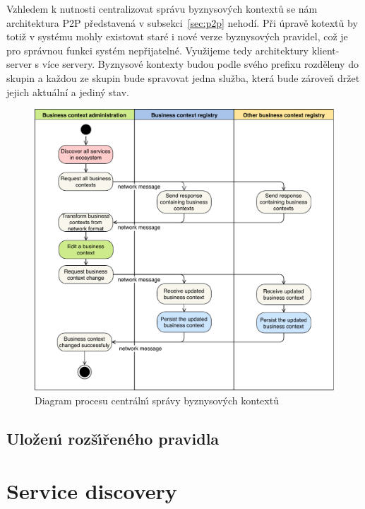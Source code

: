 Vzhledem k nutnosti centralizovat správu byznysových kontextů se nám
architektura \gls{P2P} představená v subsekci~\ref{sec:p2p} nehodí.
Při úpravě kotextů by totiž v systému mohly existovat staré i nové verze
byznysových pravidel, což je pro správnou funkci systém nepřijatelné.
Využijeme tedy architektury klient-server s více servery.
Byznysové kontexty budou podle svého prefixu rozděleny do skupin
a každou ze skupin bude spravovat jedna služba, která bude zároveň
držet jejich aktuální a jediný stav.

\begin{figure}
    \centering
    \includegraphics[keepaspectratio=true, width=0.8\linewidth]{figures/business-context-management.pdf}
    \caption{Diagram procesu centráln\'{\i} správy byznysov\'ych kontextů}
    \label{fig:business-context-management}
\end{figure} %

\subsection{Uložen\'{\i} rozš\'{\i}řeného pravidla}


\section{Service discovery}


